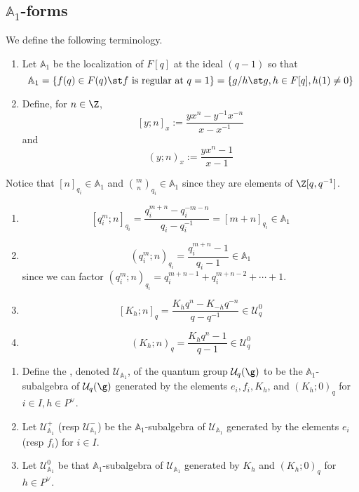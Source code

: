 \documentclass[11pt,leqno,oneside]{amsart}
\numberwithin{thm}{section}
\newcommand{\weightlattice}{P}
\newcommand{\U}{\mathcal{U}}
\newcommand{\qbinom}[3][q]{\binom{#2}{#3}_{#1}}
\newcommand{\A}{\mathbb{A}}
\begin{document}
\subsection{\(\A_1\)-forms}
\begin{defn}
  We define the following terminology.
  \begin{enumerate}
  \item  Let \(\A_1\) be the localization of \(F[q]\) at the ideal \((q-1)\)
  so that \[
    \A_1 = \{f(q) \in F(q) \st f \text{ is regular at }q=1\} = \{g/h
    \st g,h \in F[q], h(1) \neq 0\}
  \]
  \item Define, for \(n \in \Z\), \[
    [y;n]_x := \frac{yx^n-y^{-1}x^{-n}}{x-x^{-1}}
  \]
  and \[
    (y;n)_x := \frac{yx^n-1}{x-1}
  \]
\end{enumerate}
\end{defn}
Notice that \([n]_{q_i} \in \A_1\) and \(\qbinom[q_i]{m}{n} \in \A_1\)
since they are elements of \(\Z[q,q^{-1}]\).
\begin{example}
  \begin{enumerate}
  \item \[
      [q_i^m;n]_{q_i} = \frac{q_i^{m+n} - q_i^{-m-n}}{q_i-q_i^{-1}} = [m+n]_{q_i}
      \in \A_1
    \]
  \item \[
      (q_i^m;n)_{q_i} = \frac{q_i^{m+n}-1}{q_i-1} \in \A_1
    \]
    since we can factor \((q_i^m;n)_{q_i} = q_i^{m+n-1}+q_i^{m+n-2} +
    \cdots + 1\).
  \item \[
      [K_h;n]_q = \frac{K_h q^n - K_{-h}q^{-n}}{q-q^{-1}} \in \U_q^0
    \]
  \item \[
      (K_h;n)_q = \frac{K_h q^n-1}{q-1} \in \U_q^0
    \]
  \end{enumerate}
\end{example}
\begin{defn}
  \begin{enumerate}
  \item Define the \de{\(\A_1\)-form}, denoted \(\U_{\A_1}\), of the
    quantum group \(\U_q(\g)\) to be the \(\A_1\)-subalgebra of
    \(\U_q(\g)\) generated by the elements \(e_i, f_i, K_h\), and
    \((K_h;0)_q\) for \(i \in I, h \in \weightlattice^\vee\).
  \item Let \(\U_{\A_1}^+\) (resp \(\U_{\A_1}^-\)) be the
    \(\A_1\)-subalgebra of \(\U_{\A_1}\) generated by the elements
    \(e_i\) (resp \(f_i\)) for \(i \in I\).
  \item Let \(\U_{\A_1}^0\) be that \(\A_1\)-subalgebra of
    \(\U_{\A_1}\) generated by \(K_h\) and \((K_h;0)_q\) for \(h \in
    \weightlattice^\vee\). 
  \end{enumerate}
\end{defn}
\end{document}
